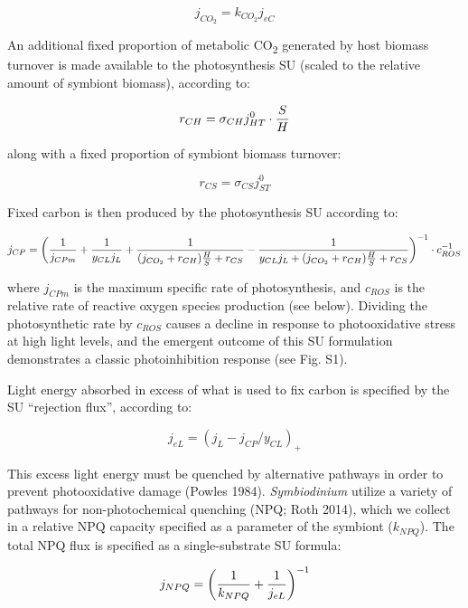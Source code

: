 \documentclass[]{elsarticle} %
\begin{document}
\begin{equation} j_{CO_2} = k_{CO_2}j_{eC} \end{equation}

An additional fixed proportion of metabolic CO\textsubscript{2}
generated by host biomass turnover is made available to the
photosynthesis SU (scaled to the relative amount of symbiont biomass),
according to:

\begin{equation} r_{CH}=\sigma_{CH}j_{HT}^0 \cdot {S \over H} \end{equation}

along with a fixed proportion of symbiont biomass turnover:

\begin{equation} r_{CS}=\sigma_{CS}j_{ST}^0 \end{equation}

Fixed carbon is then produced by the photosynthesis SU according to:

\begin{equation} j_{CP} = \bigg({1 \over j_{CPm}} + {1 \over {y_{CL} j_L }} + {1 \over {(j_{CO_2} + r_{CH}){H \over S} + r_{CS}}} - {1 \over {y_{CL} j_L + (j_{CO_2} + r_{CH}){H \over S} + r_{CS}}}\bigg)^{-1} \cdot c_{ROS}^{-1} \end{equation}

where \(j_{CPm}\) is the maximum specific rate of photosynthesis, and
\(c_{ROS}\) is the relative rate of reactive oxygen species production
(see below). Dividing the photosynthetic rate by \(c_{ROS}\) causes a
decline in response to photooxidative stress at high light levels, and
the emergent outcome of this SU formulation demonstrates a classic
photoinhibition response (see Fig. S1).

Light energy absorbed in excess of what is used to fix carbon is
specified by the SU ``rejection flux'', according to:

\begin{equation} j_{eL} = (j_L - j_{CP} / y_{CL})_+ \end{equation}

This excess light energy must be quenched by alternative pathways in
order to prevent photooxidative damage (Powles 1984).
\emph{Symbiodinium} utilize a variety of pathways for non-photochemical
quenching (NPQ; Roth 2014), which we collect in a relative NPQ capacity
specified as a parameter of the symbiont (\(k_{NPQ}\)). The total NPQ
flux is specified as a single-substrate SU formula:

\begin{equation} j_{NPQ} = \bigg({1 \over k_{NPQ}} + {1 \over j_{eL}}\bigg)^{-1} \end{equation}
\end{document}
